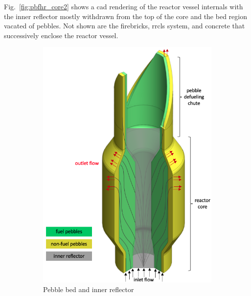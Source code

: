 Fig.\ \ref{fig:pbfhr_core2} shows a \gls{cad} rendering of the reactor vessel internals with the inner reflector mostly withdrawn from the top of the core and the bed region vacated of pebbles. Not shown are the firebricks, \gls{rrcls} system, and concrete that successively enclose the reactor vessel.

\begin{figure}[h!]
    \begin{subfigure}{0.5\linewidth}
        \centering
        \includegraphics[height=1.1\linewidth]{figs/pbfhr_core.png}
       \caption{Pebble bed and inner reflector}
       \label{fig:pbfhr_core}
    \end{subfigure}
    \begin{subfigure}{0.5\linewidth}
        \centering

\end{subfigure}
\end{figure}
